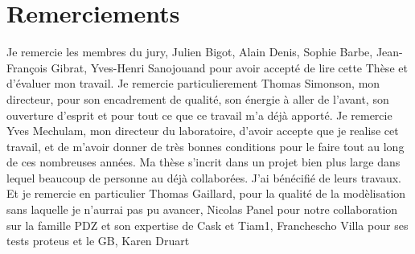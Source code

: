 \chapter*{Remerciements}

Je remercie les membres du jury, Julien Bigot, Alain Denis, Sophie Barbe, Jean-François Gibrat, Yves-Henri Sanojouand pour avoir accepté de lire cette Thèse et d'évaluer mon travail. Je remercie particulierement Thomas Simonson, mon directeur, pour son encadrement de qualité, son énergie à aller de l'avant, son ouverture d'esprit et pour tout ce que ce travail m'a déjà apporté. Je remercie Yves Mechulam, mon directeur du laboratoire, d'avoir accepte que je realise cet travail, et de m'avoir donner de très bonnes conditions pour le faire tout au long de ces nombreuses années.
Ma thèse s'incrit dans un projet bien plus large dans lequel beaucoup de personne au déjà collaborées. J'ai bénécifié de leurs travaux. Et je remercie en particulier Thomas Gaillard, pour la qualité de la modèlisation sans laquelle je n'aurrai pas pu avancer, Nicolas Panel pour notre collaboration sur la famille PDZ et son expertise de Cask et Tiam1, Franchescho Villa pour ses tests proteus et le GB, Karen Druart  
































